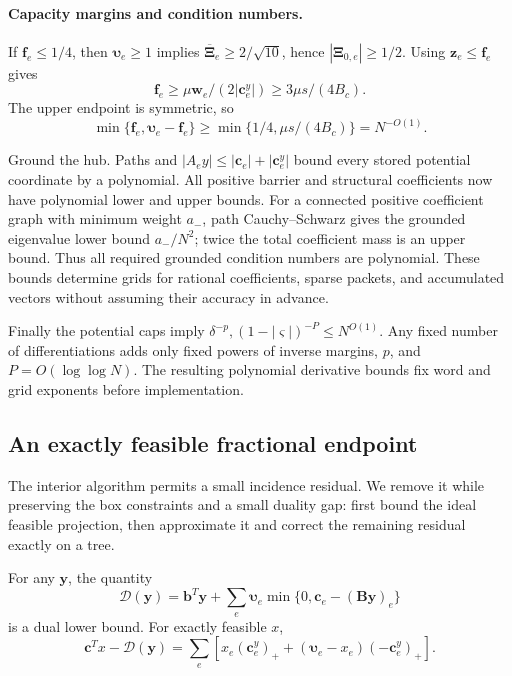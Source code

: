 \documentclass[11pt]{article}
\theoremstyle{remark}
\newcommand{\BB}{\mathbf B}
\newcommand{\bb}{\mathbf b}
\newcommand{\cc}{\mathbf c}
\newcommand{\ff}{\mathbf f}
\newcommand{\ww}{\mathbf w}
\newcommand{\yy}{\mathbf y}
\newcommand{\zz}{\mathbf z}
\newcommand{\vvs}{\boldsymbol{\varsigma}}
\newcommand{\vvu}{\boldsymbol{\upsilon}}
\newcommand{\XXi}{\boldsymbol{\Xi}}
\newcommand{\XXibar}{\overline{\boldsymbol{\Xi}}}
\begin{document}
\paragraph{Capacity margins and condition numbers.} If $\ff_e\le1/4$, then
$\vvu_e\ge1$ implies $\XXibar_e\ge2/\sqrt{10}$, hence $|\XXi_{0,e}|\ge1/2$.
Using $\zz_e\le \ff_e$ gives
\[
 \ff_e\ge\mu \ww_e/(2|\cc_e^y|)\ge3\mu s/(4B_c).
\]
The upper endpoint is symmetric, so
\begin{equation}\label{eq:ram27-margin-range}
 \min\{\ff_e,\vvu_e-\ff_e\}
       \ge\min\{1/4,\mu s/(4B_c)\}=N^{-O(1)} .
\end{equation}

Ground the hub.
Paths and $|A_ey|\le|\cc_e|+|\cc_e^y|$ bound every stored potential coordinate by a
polynomial.
All positive barrier and structural coefficients now have polynomial lower and
upper bounds.
For a connected positive coefficient graph with minimum weight $a_-$, path
Cauchy--Schwarz gives the grounded eigenvalue lower bound $a_-/N^2$; twice the
total coefficient mass is an upper bound.
Thus all required grounded condition numbers are polynomial.
These bounds determine grids for rational coefficients, sparse packets, and
accumulated vectors without assuming their accuracy in advance.

Finally the potential caps imply $\delta^{-p},(1-|\vvs|)^{-P}\le N^{O(1)}$.
Any fixed number of differentiations adds only fixed powers of inverse margins,
$p$, and $P=O(\log\log N)$.
The resulting polynomial derivative bounds fix word and grid exponents before
implementation.

\subsection{An exactly feasible fractional endpoint}

The interior algorithm permits a small incidence residual.
We remove it while preserving the box constraints and a small duality gap: first
bound the ideal feasible projection, then approximate it and correct the
remaining residual exactly on a tree.

For any $\yy$, the quantity
\[
 \mathcal D(\yy)=\bb^T\yy+\sum_e\vvu_e\min\{0,\cc_e-(\BB\yy)_e\}
\]
is a dual lower bound.
For exactly feasible $x$,
\begin{equation}\label{eq:ram27-gap}
 \cc^Tx-\mathcal D(\yy)=\sum_e
       \left[x_e(\cc_e^y)_++(\vvu_e-x_e)(-\cc_e^y)_+\right].
\end{equation}
\end{document}
